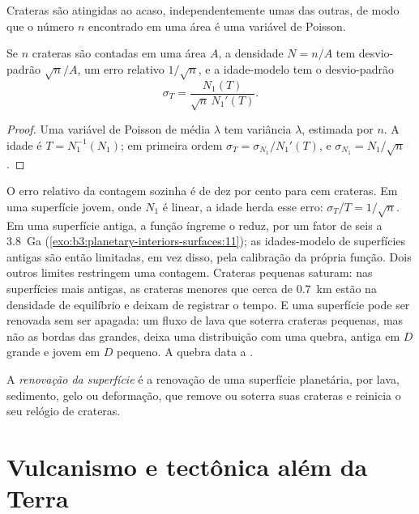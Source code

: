 Crateras são atingidas ao acaso, independentemente umas das outras, de modo que o número
$n$ encontrado em uma área é uma variável de Poisson.

\begin{proposition}\label{prop:b3:planetary-interiors-surfaces:poisson}
Se $n$ crateras são contadas em uma área $A$, a densidade $N = n/A$ tem
desvio-padrão $\sqrt n/A$, um erro relativo $1/\sqrt n$, e a idade-modelo tem
o desvio-padrão
\[
  \sigma_T = \frac{N_1(T)}{\sqrt n\,N_1'(T)} .
\]
\end{proposition}

\begin{proof}
Uma variável de Poisson de média $\lambda$ tem variância $\lambda$, estimada por
$n$. A idade é $T = N_1^{-1}(N_1)$; em primeira ordem $\sigma_T =
\sigma_{N_1}/N_1'(T)$, e $\sigma_{N_1} = N_1/\sqrt n$.
\end{proof}

O erro relativo da contagem sozinha é de dez por cento para cem
crateras. Em uma superfície jovem, onde $N_1$ é linear, a idade herda esse
erro: $\sigma_T/T = 1/\sqrt n$. Em uma superfície antiga, a função íngreme
o reduz, por um fator de seis a \qty{3.8}{Ga} (\cref{exo:b3:planetary-interiors-surfaces:11});
as idades-modelo de superfícies antigas são então limitadas, em vez disso, pela
calibração da própria função. Dois outros limites restringem uma contagem. Crateras
pequenas saturam: nas superfícies mais antigas, as crateras menores que cerca de \qty{0.7}{km}
estão na densidade de equilíbrio e deixam de registrar o tempo. E uma superfície pode ser
renovada sem ser apagada: um fluxo de lava que soterra crateras pequenas, mas não as
bordas das grandes, deixa uma distribuição com uma quebra, antiga em $D$ grande e
jovem em $D$ pequeno. A quebra data a .

\begin{definition}\label{def:b3:planetary-interiors-surfaces:resurfacing}
A \emph{renovação da superfície} é a renovação de uma
superfície planetária, por lava, sedimento, gelo ou deformação, que remove ou soterra
suas crateras e reinicia o seu relógio de crateras.
\end{definition}

\section{Vulcanismo e tectônica além da Terra}\label{sec:b3:planetary-interiors-surfaces:volcanism}

